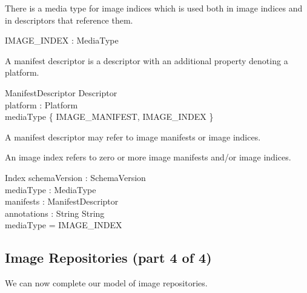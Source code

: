 \documentclass[a4paper,twoside,12pt]{article}
\begin{document}
There is a media type for image indices which is used both in image indices and in descriptors that reference them.
\begin{axdef}
  IMAGE\_INDEX : MediaType \\
\end{axdef}

A manifest descriptor is a descriptor with an additional property denoting a platform.
\begin{schema}{ManifestDescriptor}
  Descriptor \\
  platform : Platform \\
\where
  mediaType \in \{ IMAGE\_MANIFEST, IMAGE\_INDEX \} \\
\end{schema}
A manifest descriptor may refer to image manifests or image indices.

An image index refers to zero or more image manifests and/or image indices.
\begin{schema}{Index}
  schemaVersion : SchemaVersion \\
  mediaType : MediaType \\
  manifests : \seq ManifestDescriptor \\
  annotations : String \pfun String \\
\where
  mediaType = IMAGE\_INDEX \\
\end{schema}

\subsection{Image Repositories (part 4 of 4)}

We can now complete our model of image repositories.
\end{document}
